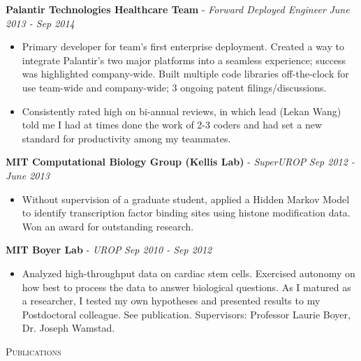 \documentclass{article}
\newenvironment{changemargin}[2]{%
  \begin{list}{}{%
    \setlength{\topsep}{0pt}%
    \setlength{\leftmargin}{#1}%
    \setlength{\rightmargin}{#2}%
    \setlength{\listparindent}{\parindent}%
    \setlength{\itemindent}{\parindent}%
    \setlength{\parsep}{\parskip}%
  }%
  \item[]}{\end{list}
}
\newcommand{\lineover}{
	\begin{changemargin}{-0.05in}{-0.05in}
		\vspace*{-8pt}
		\hrulefill \\
		\vspace*{-2pt}
	\end{changemargin}
}
\newcommand{\header}[1]{
	\begin{changemargin}{-0.5in}{-0.5in}
		\scshape{#1}\\
  	\lineover
	\end{changemargin}
}
\newenvironment{body} {
	\vspace*{-16pt}
	\begin{changemargin}{-0.25in}{-0.5in}
  }	
	{\end{changemargin}
}
\begin{document}
\begin{body}
	\small{\vspace{17pt}
	\textbf{Palantir Technologies Healthcare Team} - \emph{Forward Deployed Engineer} \hfill \emph{June 2013 - Sep 2014} \\
   \begin{itemize}
           \item Primary developer for team's first enterprise deployment. Created a way to integrate Palantir's two major platforms into a seamless experience; success was highlighted company-wide. Built multiple code libraries off-the-clock for use team-wide and company-wide; 3 ongoing patent filings/discussions.
           \item Consistently rated high on bi-annual reviews, in which lead (Lekan Wang) told me I had at times done the work of 2-3 coders and had set a new standard for productivity among my teammates.
   \end{itemize}
	\textbf{MIT Computational Biology Group (Kellis Lab)} - \emph{SuperUROP} \hfill \emph{Sep 2012 - June 2013} \\
   \begin{itemize}
           \item Without supervision of a graduate student, applied a Hidden Markov Model to identify transcription factor binding sites using histone modification data. Won an award for outstanding research.
   \end{itemize}
	\textbf{MIT Boyer Lab} - \emph{UROP} \hfill \emph{Sep 2010 - Sep 2012} \\
   \begin{itemize}
           \item Analyzed high-throughput data on cardiac stem cells.  Exercised autonomy on how best to process the data to answer biological questions. As I matured as a researcher, I tested my own hypotheses and presented results to my Postdoctoral colleague. See publication.
                 Supervisors: Professor Laurie Boyer, Dr. Joseph Wamstad.
   \end{itemize}}
\end{body}



\header{Publications}
\end{document}
